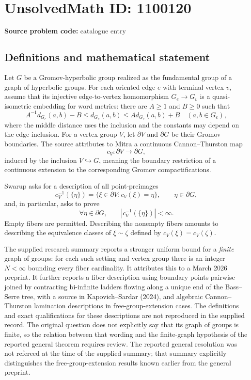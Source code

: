 \documentclass[11pt]{article}
\begin{document}
\section*{UnsolvedMath ID: 1100120}
\textbf{Source problem code:} catalogue entry
\subsection{Definitions and mathematical statement}
Let $G$ be a Gromov-hyperbolic group realized as the fundamental group of a graph of hyperbolic groups. For each oriented edge $e$ with terminal vertex $v$, assume that its injective edge-to-vertex homomorphism $G_e\to G_v$ is a quasi-isometric embedding for word metrics: there are $A\geq1$ and $B\geq0$ such that
\[
A^{-1}d_{G_e}(a,b)-B\leq d_{G_v}(a,b)\leq A d_{G_e}(a,b)+B
\quad(a,b\in G_e),
\]
where the middle distance uses the inclusion and the constants may depend on the edge inclusion. For a vertex group $V$, let $\partial V$ and $\partial G$ be their Gromov boundaries. The source attributes to Mitra a continuous Cannon--Thurston map
\[
c_V:\partial V\longrightarrow\partial G,
\]
induced by the inclusion $V\hookrightarrow G$, meaning the boundary restriction of a continuous extension to the corresponding Gromov compactifications.

Swarup asks for a description of all point-preimages
\[
c_V^{-1}(\{\eta\})=\{\xi\in\partial V:c_V(\xi)=\eta\},\qquad\eta\in\partial G,
\]
and, in particular, asks to prove
\[
\forall\eta\in\partial G,\qquad |c_V^{-1}(\{\eta\})|<\infty.
\]
Empty fibers are permitted. Describing the nonempty fibers amounts to describing the equivalence classes of $\xi\sim\zeta$ defined by $c_V(\xi)=c_V(\zeta)$.

The supplied research summary reports a stronger uniform bound for a \emph{finite} graph of groups: for each such setting and vertex group there is an integer $N<\infty$ bounding every fiber cardinality. It attributes this to a March 2026 preprint. It further reports a fiber description using boundary points pairwise joined by contracting bi-infinite ladders flowing along a unique end of the Bass--Serre tree, with a source in Kapovich--Sardar (2024), and algebraic Cannon--Thurston lamination descriptions in free-group-extension cases. The definitions and exact qualifications for these descriptions are not reproduced in the supplied record. The original question does not explicitly say that its graph of groups is finite, so the relation between that wording and the finite-graph hypothesis of the reported general theorem requires review. The reported general resolution was not refereed at the time of the supplied summary; that summary explicitly distinguishes the free-group-extension results known earlier from the general preprint.
\end{document}
